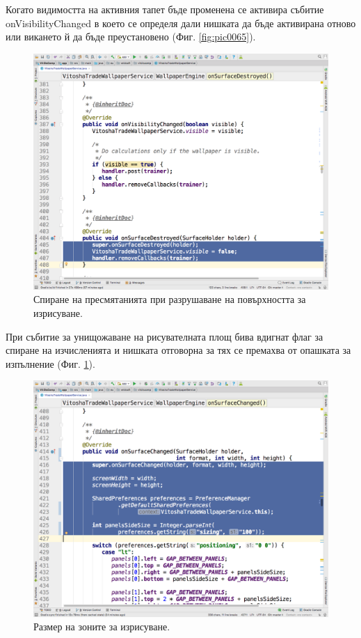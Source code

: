 \documentclass[book,14pt,oneside,openany]{memoir}
\begin{document}
Когато видимостта на активния тапет бъде променена се активира събитие onVisibilityChanged в което се определя дали нишката да бъде активирана отново или викането й да бъде преустановено (Фиг. \ref{fig:pic0065}).

\begin{figure}[h]
  \centering
  \includegraphics[height=0.45\pdfpageheight]{pic0066}
  \caption{Спиране на пресмятанията при разрушаване на повърхността за изрисуване.}
\label{fig:pic0066}
\end{figure}
\FloatBarrier

При събитие за унищожаване на рисувателната площ бива вдигнат флаг за спиране на изчисленията и нишката отговорна за тях се премахва от опашката за изпълнение (Фиг. \ref{fig:pic0066}).

\begin{figure}[h]
  \centering
  \includegraphics[height=0.45\pdfpageheight]{pic0067}
  \caption{Размер на зоните за изрисуване.}
\label{fig:pic0067}
\end{figure}
\FloatBarrier
\end{document}
